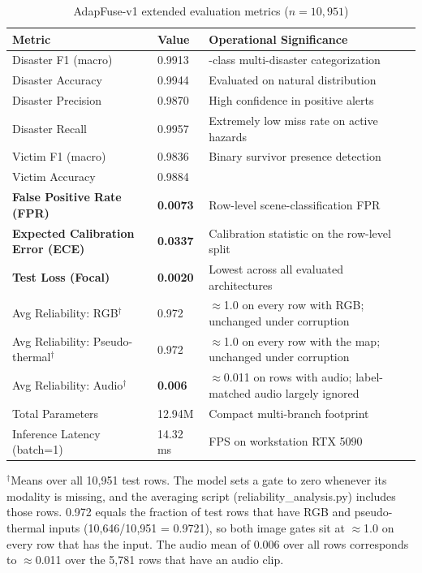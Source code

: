 \documentclass[journal]{IEEEtran}
\begin{document}
\begin{table}[!t]
\centering
\caption[AdapFuse-v1 extended evaluation metrics]{AdapFuse-v1 extended evaluation metrics ($n=10{,}951$)}
\label{tab:adaptfuse_extended}
\begin{tabular}{@{}ll>{\raggedright\arraybackslash}p{5.2cm}@{}}
\toprule
\textbf{Metric} & \textbf{Value} & \textbf{Operational Significance} \\
\midrule
Disaster F1 (macro)    & 0.9913 & 4-class multi-disaster categorization \\
Disaster Accuracy      & 0.9944 & Evaluated on natural distribution \\
Disaster Precision     & 0.9870 & High confidence in positive alerts \\
Disaster Recall        & 0.9957 & Extremely low miss rate on active hazards \\
Victim F1 (macro)      & 0.9836 & Binary survivor presence detection \\
Victim Accuracy        & 0.9884 & \\
\midrule
\textbf{False Positive Rate (FPR)} & \textbf{0.0073} & Row-level scene-classification FPR \\
\textbf{Expected Calibration Error (ECE)} & \textbf{0.0337} & Calibration statistic on the row-level split \\
\textbf{Test Loss (Focal)} & \textbf{0.0020} & Lowest across all evaluated architectures \\
\midrule
Avg Reliability: RGB$^\dagger$   & 0.972  & $\approx$1.0 on every row with RGB; unchanged under corruption \\
Avg Reliability: Pseudo-thermal$^\dagger$ & 0.972 & $\approx$1.0 on every row with the map; unchanged under corruption \\
Avg Reliability: Audio$^\dagger$ & \textbf{0.006}  & $\approx$0.011 on rows with audio; label-matched audio largely ignored \\
\midrule
Total Parameters       & 12.94M & Compact multi-branch footprint \\
Inference Latency (batch=1) & 14.32 ms & 69.9 FPS on workstation RTX 5090 \\
\bottomrule
\end{tabular}

\vspace{1mm}
\parbox{0.95\textwidth}{\footnotesize $^\dagger$Means over all 10{,}951 test rows. The model sets a gate to zero whenever its modality is missing, and the averaging script (reliability\_analysis.py) includes those rows. 0.972 equals the fraction of test rows that have RGB and pseudo-thermal inputs (10{,}646/10{,}951 = 0.9721), so both image gates sit at $\approx$1.0 on every row that has the input. The audio mean of 0.006 over all rows corresponds to $\approx$0.011 over the 5{,}781 rows that have an audio clip.}
\end{table}
\end{document}
